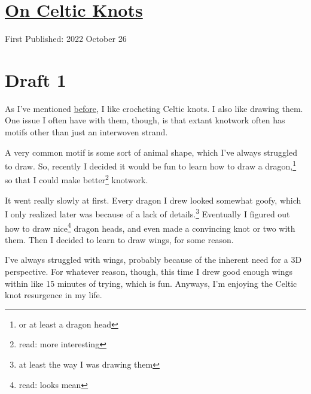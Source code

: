 \documentclass[12pt]{article}[titlepage]
\renewcommand{\,}{\textsuperscript{,}}
\begin{document}
\doublespacing
\section{\href{celtic-knots.html}{On Celtic Knots}}
First Published: 2022 October 26

\section{Draft 1}
As I've mentioned \href{celtic-crochet.html}{before}, I like crocheting Celtic knots.
I also like drawing them.
One issue I often have with them, though, is that extant knotwork often has motifs other than just an interwoven strand.

A very common motif is some sort of animal shape, which I've always struggled to draw.
So, recently I decided it would be fun to learn how to draw a dragon,\footnote{or at least a dragon head} so that I could make better\footnote{read: more interesting} knotwork.

It went really slowly at first.
Every dragon I drew looked somewhat goofy, which I only realized later was because of a lack of details.\footnote{at least the way I was drawing them}
Eventually I figured out how to draw nice\footnote{read: looks mean} dragon heads, and even made a convincing knot or two with them.
Then I decided to learn to draw wings, for some reason.

I've always struggled with wings, probably because of the inherent need for a 3D perspective.
For whatever reason, though, this time I drew good enough wings within like 15 minutes of trying, which is fun.
Anyways, I'm enjoying the Celtic knot resurgence in my life.
\end{document}
